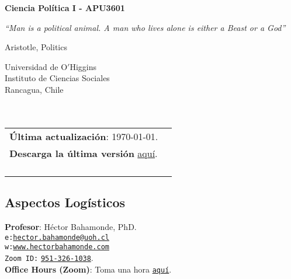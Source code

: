 \documentclass[letterpaper]{article}
\def\name{Ciencia Pol\'itica I - APU3601}
\begin{document}

\centerline{\huge \bf \name}

\epigraph{\emph{``Man is a political animal. A man who lives alone is either a Beast or a God''}}{Aristotle, Politics}


\vspace{0.25in}

\begin{minipage}{0.45\linewidth}
 Universidad de O$'$Higgins \\
  Instituto de Ciencias Sociales \\
  Rancagua, Chile\\
  \\
  \\

\end{minipage}
\hspace{4cm}\begin{minipage}{0.45\linewidth}
  \begin{tabular}{ll}
{\bf \'Ultima actualizaci\'on}: \today. \\
 {\bf Descarga la \'ultima versi\'on} \href{https://github.com/hbahamonde/Ciencia_Politica_I/raw/master/Bahamonde_Ciencia_Politica_I.pdf}{aqu\'i}.%
    \\
    \\
    \\
    \\
    \\
  \end{tabular}
\end{minipage}



\subsection*{Aspectos Log\'isticos}


\vspace{0.8mm}
{\bf Profesor}: H\'ector Bahamonde, PhD.\\
\texttt{e:}\href{mailto:hector.bahamonde@uoh.cl}{\texttt{hector.bahamonde@uoh.cl}}\\
\texttt{w:}\href{http://www.hectorbahamonde.com}{\texttt{www.hectorbahamonde.com}}\\
\texttt{Zoom ID:} \href{https://us02web.zoom.us/j/9513261038?pwd=S3BSWXQxZW11NC9CRjRoMmd0TkpEZz09}{\texttt{951-326-1038}}.\\
{\bf Office Hours (Zoom)}: Toma una hora \href{https://calendly.com/bahamonde/officehours}{\texttt{aqu\'i}}.
\end{document}
